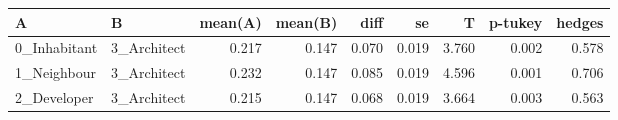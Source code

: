 \begin{tabular}{llrrrrrrr}
\toprule
            A &            B &  mean(A) &  mean(B) &   diff &     se &      T &  p-tukey &  hedges \\
\midrule
 0\_Inhabitant &  3\_Architect &    0.217 &    0.147 &  0.070 &  0.019 &  3.760 &    0.002 &   0.578 \\
  1\_Neighbour &  3\_Architect &    0.232 &    0.147 &  0.085 &  0.019 &  4.596 &    0.001 &   0.706 \\
  2\_Developer &  3\_Architect &    0.215 &    0.147 &  0.068 &  0.019 &  3.664 &    0.003 &   0.563 \\
\bottomrule
\end{tabular}
